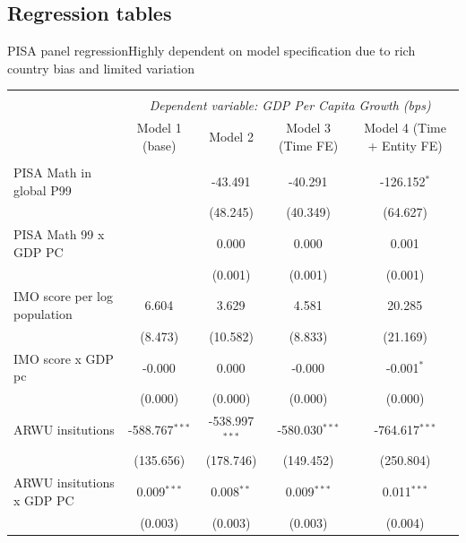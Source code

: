 \documentclass[10pt]{beamer}
\begin{document}
\subsection{Regression tables}
\begin{frame}{PISA panel regression}{Highly dependent on model specification due to rich country bias and limited variation}
    \begin{table}[!htbp] \centering
        \resizebox{\linewidth}{!} {
            \begin{tabular}{@{\extracolsep{5pt}}lcccc}
                \\[-1.8ex]\hline
                \hline \\[-1.8ex]
                & \multicolumn{4}{c}{\textit{Dependent variable: GDP Per Capita Growth (bps)}} \
                \cr \cline{2-5}
                \\[-1.8ex] & \multicolumn{1}{c}{Model 1 (base)} & \multicolumn{1}{c}{Model 2} & \multicolumn{1}{c}{Model 3 (Time FE)} & \multicolumn{1}{c}{Model 4 (Time + Entity FE)}  \\
                \hline \\[-1.8ex]
                 PISA Math in global P99 & & -43.491$^{}$ & -40.291$^{}$ & -126.152$^{*}$ \\
                & & (48.245) & (40.349) & (64.627) \\
                 PISA Math 99 x GDP PC & & 0.000$^{}$ & 0.000$^{}$ & 0.001$^{}$ \\
                & & (0.001) & (0.001) & (0.001) \\
                 IMO score per log population & 6.604$^{}$ & 3.629$^{}$ & 4.581$^{}$ & 20.285$^{}$ \\
                & (8.473) & (10.582) & (8.833) & (21.169) \\
                 IMO score x GDP pc & -0.000$^{}$ & 0.000$^{}$ & -0.000$^{}$ & -0.001$^{*}$ \\
                & (0.000) & (0.000) & (0.000) & (0.000) \\
                 ARWU insitutions & -588.767$^{***}$ & -538.997$^{***}$ & -580.030$^{***}$ & -764.617$^{***}$ \\
                & (135.656) & (178.746) & (149.452) & (250.804) \\
                 ARWU insitutions x GDP PC & 0.009$^{***}$ & 0.008$^{**}$ & 0.009$^{***}$ & 0.011$^{***}$ \\
                & (0.003) & (0.003) & (0.003) & (0.004) \\

\end{tabular}}
\end{table}
\end{frame}
\end{document}

